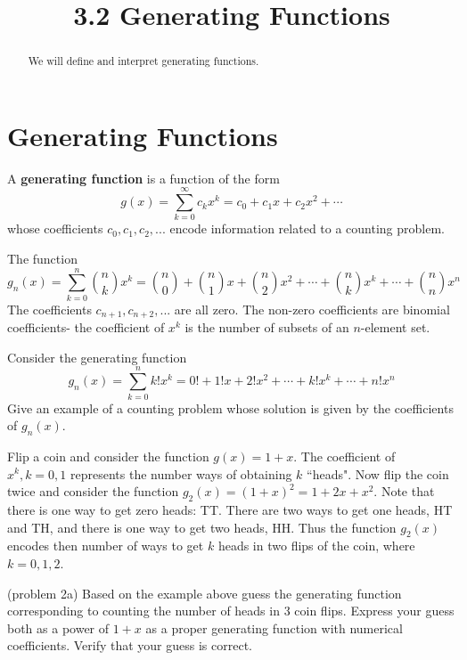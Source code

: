 \documentclass[handout]{ximera}
\title{3.2 Generating Functions}
\begin{document}
\begin{abstract}
We will define and interpret generating functions.
\end{abstract}

\maketitle

\section{Generating Functions}

\begin{definition}
A \textbf{generating function} is a function of the form
\[
g(x) = \sum_{k=0}^\infty c_kx^k = c_0 + c_1 x + c_2 x^2 + \cdots
\]
whose coefficients $c_0, c_1, c_2, ...$ encode information related to a counting problem.
\end{definition}


\begin{example}[example 1]
The function
\[
g_n(x) = \sum_{k=0}^n \binom{n}{k}x^k  = \binom{n}{0}+ \binom{n}{1}x + \binom{n}{2}x^2 + \cdots + 
\binom{n}{k}x^k + \cdots + \binom{n}{n} x^n
\]
The coefficients $c_{n+1}, c_{n+2}, ...$ are all zero.
The non-zero coefficients are binomial coefficients- the coefficient of $x^k$ is the number of subsets of an $n$-element set.
\end{example}

\begin{problem}
Consider the generating function
\[
g_n(x) = \sum_{k=0}^n k!x^k  = 0!+ 1!x + 2!x^2 + \cdots + 
k!x^k + \cdots + n! x^n
\]
Give an example of a counting problem whose solution is given by the coefficients of $g_n(x)$.
\end{problem}

\begin{example}[example 2]
Flip a coin and consider the function $g(x) = 1+x$.  The coefficient of $x^k, k = 0,1$ represents the number ways of 
obtaining $k$ ``heads". Now flip the coin twice and consider the function $g_2(x) = (1+x)^2 = 1 + 2x + x^2$.
Note that there is one way to get zero heads: TT. There are two ways to get one heads, HT and TH, 
and there is one way to get two heads, HH. Thus the function $g_2(x)$ encodes then number of ways to 
get $k$ heads in two flips of the coin, 
where $k = 0, 1, 2$.
\end{example}

\begin{problem}(problem 2a)
Based on the example above guess the generating function corresponding to counting the number of heads in 3 coin flips.
Express your guess both as a power of $1+x$ as a proper generating function with numerical coefficients.
Verify that your guess is correct. 
\end{problem}
\end{document}
